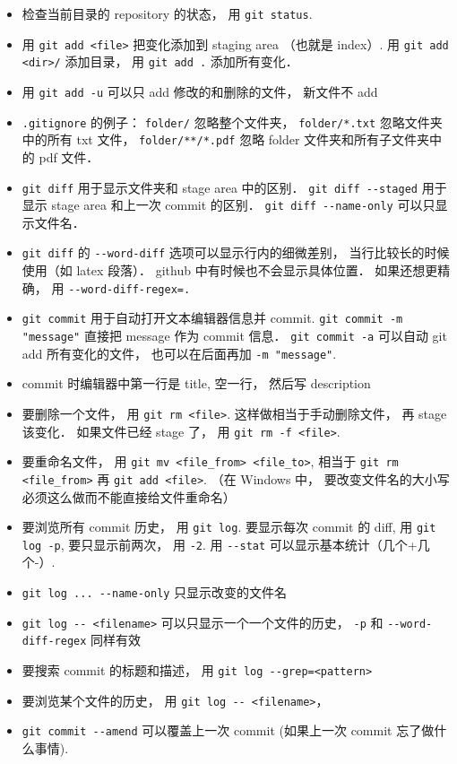 \begin{itemize}
\item 检查当前目录的 repository 的状态， 用 \verb|git status|. 
\item 用 \verb|git add <file>| 把变化添加到 staging area （也就是 index）. 用 \verb|git add <dir>/| 添加目录， 用 \verb|git add .| 添加所有变化．
\item 用 \verb|git add -u| 可以只 add 修改的和删除的文件， 新文件不 add
\item \verb|.gitignore| 的例子： \verb|folder/| 忽略整个文件夹， \verb|folder/*.txt| 忽略文件夹中的所有 txt 文件， \verb|folder/**/*.pdf| 忽略 folder 文件夹和所有子文件夹中的 pdf 文件．
\item \verb|git diff| 用于显示文件夹和 stage area 中的区别． \verb|git diff --staged| 用于显示 stage area 和上一次 commit 的区别． \verb|git diff --name-only| 可以只显示文件名．
\item \verb|git diff| 的 \verb|--word-diff| 选项可以显示行内的细微差别， 当行比较长的时候使用（如 latex 段落）． github 中有时候也不会显示具体位置． 如果还想更精确， 用 \verb|--word-diff-regex=.|
\item \verb|git commit| 用于自动打开文本编辑器信息并 commit. \verb|git commit -m "message"| 直接把 message 作为 commit 信息． \verb|git commit -a| 可以自动 git add 所有变化的文件， 也可以在后面再加 \verb|-m "message"|.
\item commit 时编辑器中第一行是 title, 空一行， 然后写 description
\item 要删除一个文件， 用 \verb|git rm <file>|. 这样做相当于手动删除文件， 再 stage 该变化． 如果文件已经 stage 了， 用 \verb|git rm -f <file>|.
\item 要重命名文件， 用 \verb|git mv <file_from> <file_to>|, 相当于 \verb|git rm <file_from>| 再 \verb|git add <file>|. （在 Windows 中， 要改变文件名的大小写必须这么做而不能直接给文件重命名）
\item 要浏览所有 commit 历史， 用 \verb|git log|. 要显示每次 commit 的 diff, 用 \verb|git log -p|, 要只显示前两次， 用 \verb|-2|. 用 \verb|--stat| 可以显示基本统计（几个+几个-）.
\item \verb|git log ... --name-only| 只显示改变的文件名
\item \verb|git log -- <filename>| 可以只显示一个一个文件的历史， \verb|-p| 和 \verb|--word-diff-regex| 同样有效
\item 要搜索 commit 的标题和描述， 用 \verb|git log --grep=<pattern>|
\item 要浏览某个文件的历史， 用 \verb|git log -- <filename>|， 
\item \verb|git commit --amend| 可以覆盖上一次 commit (如果上一次 commit 忘了做什么事情).

\end{itemize}

